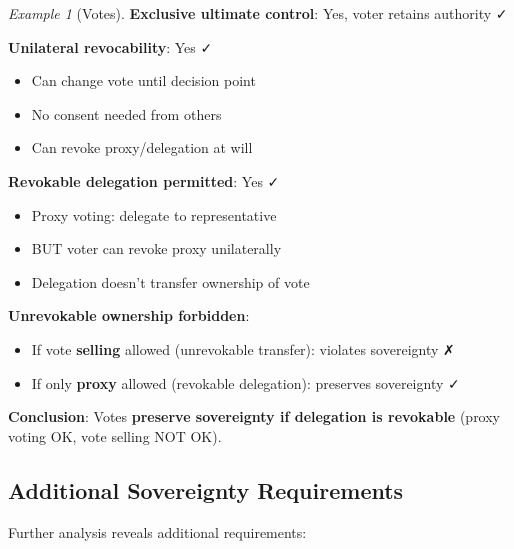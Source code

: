 \documentclass[11pt,a4paper]{article}
\theoremstyle{definition}
\theoremstyle{remark}
\newtheorem{example}[theorem]{Example}
\begin{document}
\begin{example}[Votes]
\textbf{Exclusive ultimate control}: Yes, voter retains authority ✓

\textbf{Unilateral revocability}: Yes ✓
\begin{itemize}
\item Can change vote until decision point
\item No consent needed from others
\item Can revoke proxy/delegation at will
\end{itemize}

\textbf{Revokable delegation permitted}: Yes ✓
\begin{itemize}
\item Proxy voting: delegate to representative
\item BUT voter can revoke proxy unilaterally
\item Delegation doesn't transfer ownership of vote
\end{itemize}

\textbf{Unrevokable ownership forbidden}:
\begin{itemize}
\item If vote \textbf{selling} allowed (unrevokable transfer): violates sovereignty ✗
\item If only \textbf{proxy} allowed (revokable delegation): preserves sovereignty ✓
\end{itemize}

\textbf{Conclusion}: Votes \textbf{preserve sovereignty if delegation is revokable} (proxy voting OK, vote selling NOT OK).
\end{example}

\subsection{Additional Sovereignty Requirements}

Further analysis reveals additional requirements:
\end{document}

